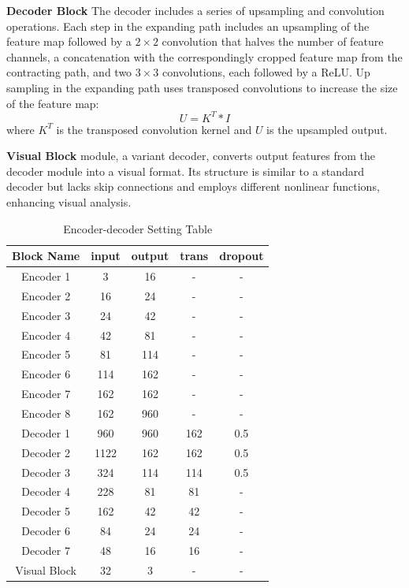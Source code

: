 \documentclass[a4paper, times, 10pt,twocolumn]{article}
\begin{document}
\textbf{Decoder Block} The decoder includes a series of upsampling and convolution operations. Each step in the expanding path includes an upsampling of the feature map followed by a $2\times2$ convolution that halves the number of feature channels, a concatenation with the correspondingly cropped feature map from the contracting path, and two $3\times3$ convolutions, each followed by a ReLU. Up sampling in the expanding path uses transposed convolutions to increase the size of the feature map:
\[
	U = K^T * I
\]
where \(K^T\) is the transposed convolution kernel and \(U\) is the upsampled output.

\textbf{Visual Block} module, a variant decoder, converts output features from the decoder module into a visual format. Its structure is similar to a standard decoder but lacks skip connections and employs different nonlinear functions, enhancing visual analysis.

\begin{table}[h]
	\caption{Encoder-decoder Setting Table}
	\label{tab:encoder_setting}
	\begin{tabular}{ccccc}
		\hline
		Block Name   & input & output & trans & dropout \\
		\hline
		Encoder 1    & 3     & 16     & -     & -       \\
		Encoder 2    & 16    & 24     & -     & -       \\
		Encoder 3    & 24    & 42     & -     & -       \\
		Encoder 4    & 42    & 81     & -     & -       \\
		Encoder 5    & 81    & 114    & -     & -       \\
		Encoder 6    & 114   & 162    & -     & -       \\
		Encoder 7    & 162   & 162    & -     & -       \\
		Encoder 8    & 162   & 960    & -     & -       \\
		Decoder 1    & 960   & 960    & 162   & 0.5     \\
		Decoder 2    & 1122  & 162    & 162   & 0.5     \\
		Decoder 3    & 324   & 114    & 114   & 0.5     \\
		Decoder 4    & 228   & 81     & 81    & -       \\
		Decoder 5    & 162   & 42     & 42    & -       \\
		Decoder 6    & 84    & 24     & 24    & -       \\
		Decoder 7    & 48    & 16     & 16    & -       \\
		Visual Block & 32    & 3      & -     & -       \\
		\hline
	\end{tabular}
\end{table}
\end{document}
